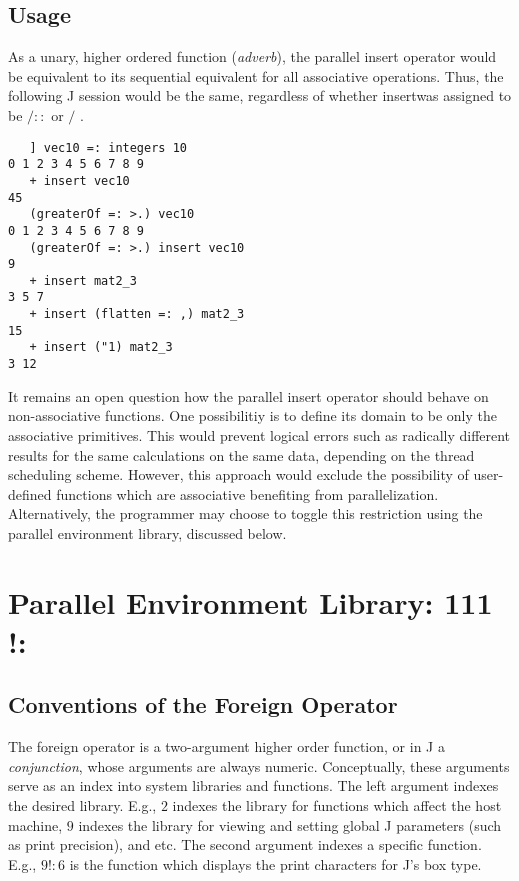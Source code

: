 \subsection{Usage}
As a unary, higher ordered function (\textit{adverb}), 
the parallel insert operator would be equivalent to its sequential equivalent 
for all associative operations. 
Thus, the following J session would be the same, 
regardless of whether \ttfamily insert\normalfont was assigned to be $/::$ or $/$ .

\begin{singlespacing}
\begin{small}
\begin{verbatim}
   ] vec10 =: integers 10
0 1 2 3 4 5 6 7 8 9
   + insert vec10
45
   (greaterOf =: >.) vec10
0 1 2 3 4 5 6 7 8 9
   (greaterOf =: >.) insert vec10
9
   + insert mat2_3
3 5 7
   + insert (flatten =: ,) mat2_3
15
   + insert ("1) mat2_3
3 12
\end{verbatim}
\end{small}
\end{singlespacing}

It remains an open question how the parallel insert operator should behave on non-associative functions.
One possibilitiy is to define its domain to be only the associative primitives. 
This would prevent logical errors such as radically different results for the same calculations on the same data, 
depending on the thread scheduling scheme. 
However, this approach would exclude the possibility of 
user-defined functions which are associative benefiting from parallelization.
Alternatively, the programmer may choose to toggle this restriction using the parallel environment library, 
discussed below.

\section{Parallel Environment Library: 111 !:} 
\label{pfor}

\subsection{Conventions of the Foreign Operator}
The foreign operator is a two-argument higher order function, or in J a \textit{conjunction}, 
whose arguments are always numeric.
Conceptually, these arguments serve as an index into system libraries and functions.
The left argument indexes the desired library.
E.g., $2$ indexes the library for functions which affect the host machine, 
$9$ indexes the library for viewing and setting global J parameters (such as print precision), and etc.
The second argument indexes a specific function.
E.g., $9!:6$ is the function which displays the print characters for J's box type.


